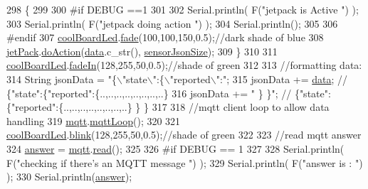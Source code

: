 \begin{DoxyCode}
298     \{
299     
300 \textcolor{preprocessor}{    #if DEBUG ==1}
301 
302         Serial.println( F(\textcolor{stringliteral}{"jetpack is Active "}) );
303         Serial.println( F(\textcolor{stringliteral}{"jetpack doing action "}) );
304         Serial.println();
305 
306 \textcolor{preprocessor}{    #endif}
307         \hyperlink{classCoolBoard_a1b1d3c684a5baa56b08486e192fd8e97}{coolBoardLed}.\hyperlink{classCoolBoardLed_af1cacbaa88db8bcf6042c1083ba41155}{fade}(100,100,150,0.5);\textcolor{comment}{//dark shade of blue     }
308         \hyperlink{classCoolBoard_a30b1357881b01ccbec676856a91e48e9}{jetPack}.\hyperlink{classJetpack_a86d2e83436ef4b85f4c3a6e85ac785b0}{doAction}(\hyperlink{classCoolBoard_a427fb753dd8575bdf821c70a5c63d695}{data}.c\_str(), \hyperlink{classCoolBoard_a58e4b6072e3ac8b141ec0befb479208e}{sensorJsonSize});
309     \}
310     
311     \hyperlink{classCoolBoard_a1b1d3c684a5baa56b08486e192fd8e97}{coolBoardLed}.\hyperlink{classCoolBoardLed_ab778f5e7bed0ab74e3906d82110493c3}{fadeIn}(128,255,50,0.5);\textcolor{comment}{//shade of green}
312 
313     \textcolor{comment}{//formatting data:}
314     String jsonData = \textcolor{stringliteral}{"\{\(\backslash\)"state\(\backslash\)":\{\(\backslash\)"reported\(\backslash\)":"};
315     jsonData += \hyperlink{classCoolBoard_a427fb753dd8575bdf821c70a5c63d695}{data}; \textcolor{comment}{// \{"state":\{"reported":\{..,..,..,..,..,..,..,..\}}
316     jsonData += \textcolor{stringliteral}{" \} \}"}; \textcolor{comment}{// \{"state":\{"reported":\{..,..,..,..,..,..,..,..\}  \} \}}
317     
318     \textcolor{comment}{//mqtt client loop to allow data handling}
319     \hyperlink{classCoolBoard_a2399f44d7c23c1149a335cb3b46d90f1}{mqtt}.\hyperlink{classCoolMQTT_aa5eaae967b562b62cbcf2b8d81f6e5d5}{mqttLoop}();
320 
321     \hyperlink{classCoolBoard_a1b1d3c684a5baa56b08486e192fd8e97}{coolBoardLed}.\hyperlink{classCoolBoardLed_a96e1ea13003eee34c9dbcef340404426}{blink}(128,255,50,0.5);\textcolor{comment}{//shade of green    }
322 
323     \textcolor{comment}{//read mqtt answer}
324     \hyperlink{classCoolBoard_a7b835fafd449e5282f7f91d787a2dc15}{answer} = \hyperlink{classCoolBoard_a2399f44d7c23c1149a335cb3b46d90f1}{mqtt}.\hyperlink{classCoolMQTT_ae3c18f6ae9723746d32765f1c8f176ca}{read}();
325 
326 \textcolor{preprocessor}{#if DEBUG == 1 }
327 
328     Serial.println( F(\textcolor{stringliteral}{"checking if there's an MQTT message "})  );
329     Serial.println( F(\textcolor{stringliteral}{"answer is : "}) );    
330     Serial.println(\hyperlink{classCoolBoard_a7b835fafd449e5282f7f91d787a2dc15}{answer});   

\end{DoxyCode}

